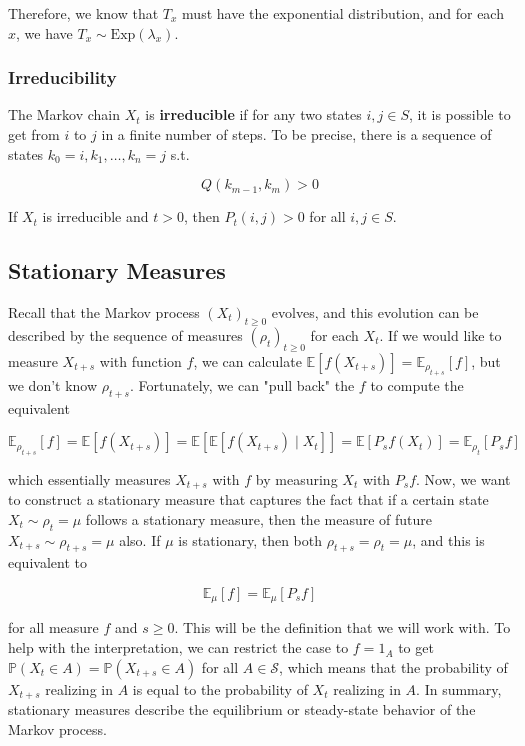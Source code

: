 \documentclass{article}
\begin{document}
      Therefore, we know that $T_x$ must have the exponential distribution, and for each $x$, we have $T_x \sim \mathrm{Exp}(\lambda_x)$. 

    \subsubsection{Irreducibility}

      \begin{definition}[Irreducibility]
        The Markov chain $X_t$ is \textbf{irreducible} if for any two states $i, j \in S$, it is possible to get from $i$ to $j$ in a finite number of steps. To be precise, there is a sequence of states $k_0 = i, k_1, \ldots, k_n = j$ s.t. 

          \[Q(k_{m-1}, k_m) > 0\]
      \end{definition}

      \begin{lemma}
        If $X_t$ is irreducible and $t > 0$, then $P_t (i, j) > 0$ for all $i, j \in S$. 
      \end{lemma}

  \subsection{Stationary Measures}

    Recall that the Markov process $(X_t)_{t \geq 0}$ evolves, and this evolution can be described by the sequence of measures $(\rho_t)_{t \geq 0}$ for each $X_t$. If we would like to measure $X_{t + s}$ with function $f$, we can calculate $\mathbb{E}[f(X_{t + s})] = \mathbb{E}_{\rho_{t + s}} [f]$, but we don't know $\rho_{t + s}$. Fortunately, we can "pull back" the $f$ to compute the equivalent 

      \[\mathbb{E}_{\rho_{t + s}} [f] = \mathbb{E}[f(X_{t + s})] = \mathbb{E}[\mathbb{E}[ f(X_{t + s}) \mid X_t]] = \mathbb{E}[P_s f (X_t)] = \mathbb{E}_{\rho_{t}} [ P_s f] \]

    which essentially measures $X_{t + s}$ with $f$ by measuring $X_t$ with $P_s f$. Now, we want to construct a stationary measure that captures the fact that if a certain state $X_t \sim \rho_t = \mu$ follows a stationary measure, then the measure of future $X_{t + s} \sim \rho_{t + s} = \mu$ also. If $\mu$ is stationary, then both $\rho_{t + s} = \rho_t = \mu$, and this is equivalent to

      \[\mathbb{E}_\mu [f] = \mathbb{E}_\mu [P_s f]\]

    for all measure $f$ and $s \geq 0$. This will be the definition that we will work with. To help with the interpretation, we can restrict the case to $f = 1_A$ to get $\mathbb{P}(X_t \in A) = \mathbb{P}(X_{t + s} \in A)$ for all $A \in \mathcal{S}$, which means that the probability of $X_{t + s}$ realizing in $A$ is equal to the probability of $X_t$ realizing in $A$. In summary, stationary measures describe the equilibrium or steady-state behavior of the Markov process.  
\end{document}
